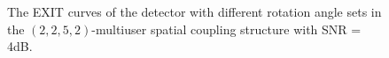 \documentclass[conference]{IEEEtran}
\begin{document}
\begin{figure}[h!]
\setlength{\abovecaptionskip}{0.cm}
\setlength{\belowcaptionskip}{-0.cm}
  \caption{The EXIT curves of the detector with different rotation angle sets in the $\left( {2,2,5,2} \right)$-multiuser spatial coupling structure with SNR = 4dB.}\label{fig.7}
    \vspace{-1em}
\end{figure}
\end{document}
